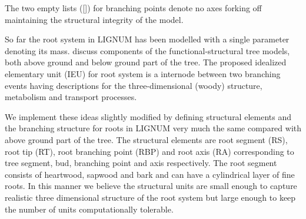 The two empty  lists ([]) for branching points  denote no axes forking
off maintaining the structural integrity of the model.

So  far the  root system  in LIGNUM  has been  modelled with  a single
parameter denoting  its mass.  \citet{sievanen:00}  discuss components
of the functional-structural tree  models, both above ground and below
ground part of the tree.  The proposed idealized elementary unit (IEU)
for root  system is  a internode between  two branching  events having
descriptions for  the three-dimensional (woody)  structure, metabolism
and transport processes.

We  implement these  ideas  slightly modified  by defining  structural
elements and the branching structure for roots in LIGNUM very much the
same  compared with  above ground  part of  the tree.   The structural
elements are  root segment (RS),  root tip (RT), root  branching point
(RBP) and root axis (RA) corresponding to tree segment, bud, branching
point and axis respectively.   The root segment consists of heartwood,
sapwood and bark  and can have a cylindrical layer  of fine roots.  In
this  manner we  believe  the  structural units  are  small enough  to
capture realistic  three dimensional structure of the  root system but
large enough to keep the number of units computationally tolerable.

